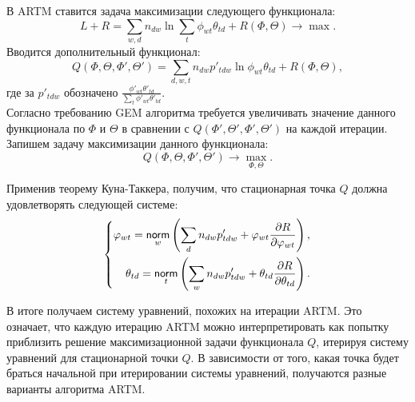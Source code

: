 \documentclass[12pt, twoside]{article}
\begin{document}
В ARTM ставится задача максимизации следующего функционала:
\[
L + R = \sum_{w,d} n_{dw} \ln\sum_t \phi_{wt} \theta_{td} +  R(\Phi, \Theta) \to \max.
\]
Вводится дополнительный функционал:
\[
	Q(\Phi, \Theta, \Phi', \Theta') = \sum\limits_{d, w, t} n_{dw} p'_{tdw} \ln{\phi_{wt}\theta_{td}} + R(\Phi, \Theta),
\]
где за $p'_{tdw}$ обозначено $\frac{\phi'_{wt} \theta'_{td}}{\sum\limits_t \phi'_{wt} \theta'_{td}}$.\\

Согласно требованию GEM алгоритма требуется увеличивать значение данного функционала по $\Phi$ и $\Theta$ в сравнении с $Q(\Phi', \Theta', \Phi', \Theta')$ на каждой итерации. Запишем задачу максимизации данного функционала:
\[
Q(\Phi, \Theta, \Phi', \Theta') \to \max_{\Phi, \Theta}.
\]

Применив теорему Куна-Таккера,  получим, что стационарная точка $Q$ должна удовлетворять следующей системе:
\[
\left\{
	\begin{aligned}
		\varphi_{wt}= \mathop{\mathsf{norm}}\limits_w \left( \sum\limits_d n_{dw} p'_{tdw} + \varphi_{wt} \frac{\partial{R}}{\partial{\varphi_{wt}}} \right),\\
		\theta_{td} = \mathop{\mathsf{norm}}\limits_t \left( \sum\limits_w n_{dw} p'_{tdw} + \theta_{td} \frac{\partial{R}}{\partial{\theta_{td}}} \right).
	\end{aligned}
\right.
\]

В итоге получаем систему уравнений, похожих на итерации ARTM. Это означает, что каждую итерацию ARTM можно интерпретировать как попытку приблизить решение максимизационной задачи функционала $Q$, итерируя систему уравнений для стационарной точки $Q$. В зависимости от того, какая точка будет браться начальной при итерировании системы уравнений, получаются разные варианты алгоритма ARTM.
\end{document}
